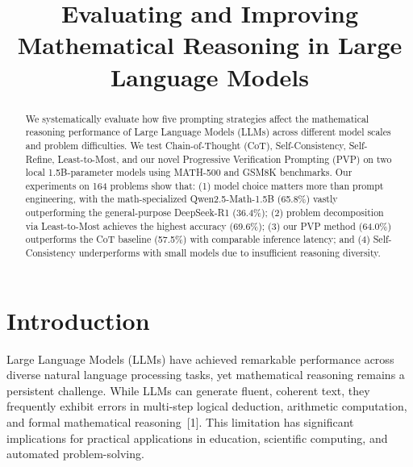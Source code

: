 \documentclass[conference]{IEEEtran}
\begin{document}
\title{Evaluating and Improving Mathematical Reasoning in Large Language Models}

\author{
}

\maketitle

\begin{abstract}
We systematically evaluate how five prompting strategies affect the mathematical reasoning performance of Large Language Models (LLMs) across different model scales and problem difficulties. We test Chain-of-Thought (CoT), Self-Consistency, Self-Refine, Least-to-Most, and our novel Progressive Verification Prompting (PVP) on two local 1.5B-parameter models using MATH-500 and GSM8K benchmarks. Our experiments on 164 problems show that: (1) model choice matters more than prompt engineering, with the math-specialized Qwen2.5-Math-1.5B (65.8\%) vastly outperforming the general-purpose DeepSeek-R1 (36.4\%); (2) problem decomposition via Least-to-Most achieves the highest accuracy (69.6\%); (3) our PVP method (64.0\%) outperforms the CoT baseline (57.5\%) with comparable inference latency; and (4) Self-Consistency underperforms with small models due to insufficient reasoning diversity.
\end{abstract}

\section{Introduction}

Large Language Models (LLMs) have achieved remarkable performance across diverse natural language processing tasks, yet mathematical reasoning remains a persistent challenge. While LLMs can generate fluent, coherent text, they frequently exhibit errors in multi-step logical deduction, arithmetic computation, and formal mathematical reasoning~[1]. This limitation has significant implications for practical applications in education, scientific computing, and automated problem-solving.
\end{document}
